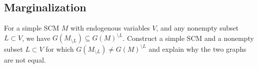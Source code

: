 \subsection{Marginalization}

For a simple SCM $M$ with endogenous variables $V$, and any nonempty subset $L \subset V$, we have $G(M_{\setminus L}) \subseteq G(M)^{\setminus L}$. 
Construct a simple SCM and a nonempty subset $L \subset V$ for which $G(M_{\setminus L}) \neq G(M)^{\setminus L}$ and explain why the two graphs are not equal.

